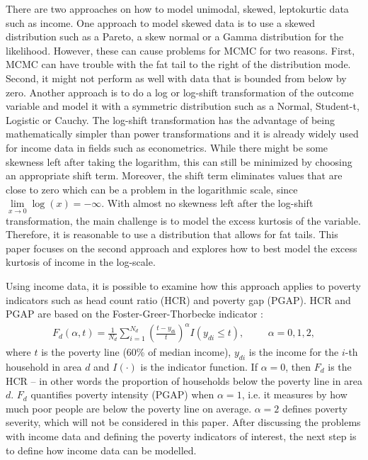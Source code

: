 There are two approaches on how to model unimodal, skewed, leptokurtic data such as income. One approach to model skewed data is to use a skewed distribution such as a Pareto, a skew normal or a Gamma distribution for the likelihood. However, these can cause problems for MCMC for two reasons. First, MCMC can have trouble with the fat tail to the right of the distribution mode. Second, it might not perform as well with data that is bounded from below by zero. Another approach is to do a log or log-shift transformation of the outcome variable and model it with a symmetric distribution such as a Normal, Student-t, Logistic or Cauchy. 
The log-shift transformation has the advantage of being mathematically simpler than power transformations and it is already widely used for income data in fields such as econometrics. While there might be some skewness left after taking the logarithm, this can still be minimized by choosing an appropriate shift term. Moreover, the shift term eliminates values that are close to zero which can be a problem in the logarithmic scale, since $\underset{x \rightarrow 0}\lim \log(x) = -\infty$. With almost no skewness left after the log-shift transformation, the main challenge is to model the excess kurtosis of the variable. Therefore, it is reasonable to use a distribution that allows for fat tails. This paper focuses on the second approach and explores how to best model the excess kurtosis of income in the log-scale.

Using income data, it is possible to examine how this approach applies to poverty indicators such as head count ratio (HCR) and poverty gap (PGAP). HCR and PGAP are based on the Foster-Greer-Thorbecke indicator \citep{foster_class_1984}:
\begin{gather*}
   F_d(\alpha, t) = \displaystyle \frac 1 {N_d} \sum_{i=1}^{N_d}\left( \frac{t - y_{di}}{t} \right)^\alpha I (y_{di} \le t), 
   \hspace{1cm}\alpha = 0, 1, 2,
\end{gather*}
where $t$ is the poverty line (60\% of median income), $y_{di}$ is the income for the $i$-th household in area $d$ and $I(\cdot)$ is the indicator function. If $\alpha = 0$, then $F_d$ is the HCR – in other words the proportion of households below the poverty line in area $d$. $F_d$ quantifies poverty intensity (PGAP) when $\alpha = 1$, i.e. it measures by how much poor people are below the poverty line on average. $\alpha = 2$ defines poverty severity, which will not be considered in this paper. After discussing the problems with income data and defining the poverty indicators of interest, the next step is to define how income data can be modelled. 




